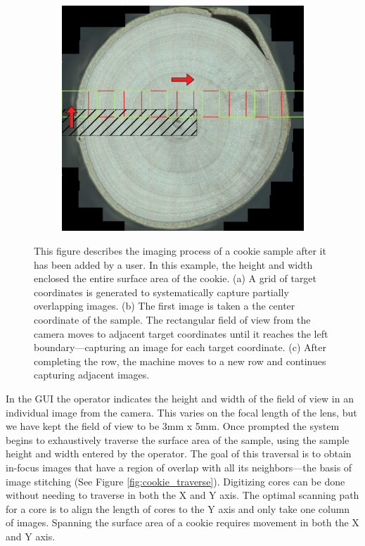 \documentclass[a4paper,12pt]{article}
\begin{document}
\begin{figure}
\begin{subfigure}{.3\textwidth}
      \caption{}
      \label{SUBFIGURE LABEL 2}
  \end{subfigure}
  \begin{subfigure}{.3\textwidth}
      \centering
      \includegraphics[width=.95\linewidth]{../content/cookie_figure_second_row.png}  
      \caption{}
      \label{SUBFIGURE LABEL 3}
  \end{subfigure}
  \caption{This figure describes the imaging process of a cookie sample after it has been added by a user. In this example, the height and width enclosed the entire surface area of the cookie. (a) A grid of target coordinates is generated to systematically capture partially overlapping images. (b) The first image is taken a the center coordinate of the sample. The rectangular field of view from the camera moves to adjacent target coordinates until it reaches the left boundary---capturing an image for each target coordinate. (c) After completing the row, the machine moves to a new row and continues capturing adjacent images. }
  \label{FIGURE LABEL}
  \end{figure}

In the GUI the operator indicates the height and width of the field of view in an individual image from the camera. 
This varies on the focal length of the lens, but we have kept the field of view to be 3mm x 5mm. 
Once prompted the system begins to exhaustively traverse the surface area of the sample, using the sample height and width entered by the operator.  
The goal of this traversal is to obtain in-focus images that have a region of overlap with all its neighbors---the basis of image stitching (See Figure \ref{fig:cookie_traverse}). 
Digitizing cores can be done without needing to traverse in both the X and Y axis. 
The optimal scanning path for a core is to align the length of cores to the Y axis and only take one column of images.
Spanning the surface area of a cookie requires movement in both the X and Y axis.
\end{document}
